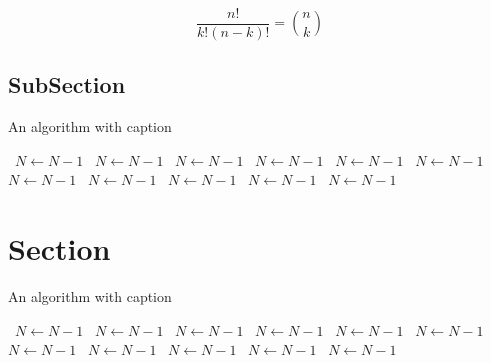 \documentclass[a4paper]{article}
\begin{document}
\[ \frac{n!}{k!(n-k)!} = \binom{n}{k} \]

\subsection{SubSection}

\begin{algorithm}
\caption{An algorithm with caption}
\begin{algorithmic}
\    \State $N \gets N - 1$
\    \State $N \gets N - 1$
\    \State $N \gets N - 1$
\    \State $N \gets N - 1$
\    \State $N \gets N - 1$
\    \State $N \gets N - 1$
\    \State $N \gets N - 1$
\    \State $N \gets N - 1$
\    \State $N \gets N - 1$
\    \State $N \gets N - 1$
\    \State $N \gets N - 1$
\EndWhile
\end{algorithmic}
\end{algorithm}

\section{Section}

\begin{algorithm}
\caption{An algorithm with caption}
\begin{algorithmic}
\    \State $N \gets N - 1$
\    \State $N \gets N - 1$
\    \State $N \gets N - 1$
\    \State $N \gets N - 1$
\    \State $N \gets N - 1$
\    \State $N \gets N - 1$
\    \State $N \gets N - 1$
\    \State $N \gets N - 1$
\    \State $N \gets N - 1$
\    \State $N \gets N - 1$
\    \State $N \gets N - 1$
\EndWhile
\end{algorithmic}
\end{algorithm}
\end{document}
